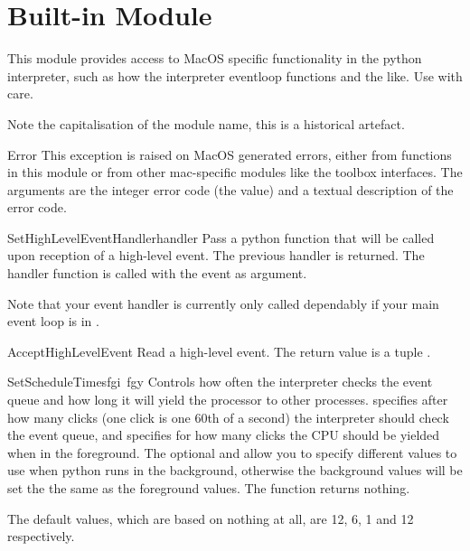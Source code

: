 \section{Built-in Module }

\renewcommand{\indexsubitem}{(in module MacOS)}

This module provides access to MacOS specific functionality in the
python interpreter, such as how the interpreter eventloop functions
and the like. Use with care.

Note the capitalisation of the module name, this is a historical
artefact.

\begin{excdesc}{Error}
This exception is raised on MacOS generated errors, either from
functions in this module or from other mac-specific modules like the
toolbox interfaces. The arguments are the integer error code (the
 value) and a textual description of the error code.
\end{excdesc}

\begin{funcdesc}{SetHighLevelEventHandler}{handler}
Pass a python function that will be called upon reception of a
high-level event. The previous handler is returned. The handler
function is called with the event as argument.

Note that your event handler is currently only called dependably if
your main event loop is in .
\end{funcdesc}

\begin{funcdesc}{AcceptHighLevelEvent}{}
Read a high-level event. The return value is a tuple .
\end{funcdesc}

\begin{funcdesc}{SetScheduleTimes}{fgi\, fgy }
Controls how often the interpreter checks the event queue and how
long it will yield the processor to other processes. 
specifies after how many clicks (one click is one 60th of a second)
the interpreter should check the event queue, and  specifies
for how many clicks the CPU should be yielded when in the
foreground. The optional  and  allow you to specify
different values to use when python runs in the background, otherwise
the background values will be set the the same as the foreground
values. The function returns nothing.

The default values, which are based on nothing at all, are 12, 6, 1
and 12 respectively.
\end{funcdesc}

